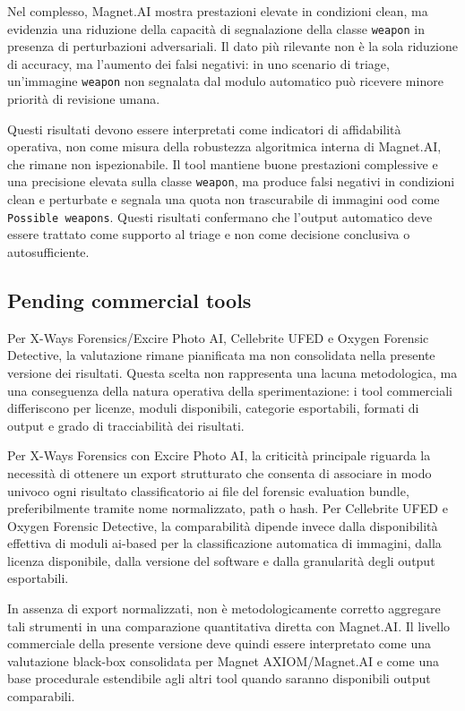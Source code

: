 Nel complesso, Magnet.AI mostra prestazioni elevate in condizioni clean, ma
evidenzia una riduzione della capacità di segnalazione della classe
\texttt{weapon} in presenza di perturbazioni adversariali. Il dato più rilevante
non è la sola riduzione di accuracy, ma l'aumento dei falsi negativi: in uno
scenario di triage, un'immagine \texttt{weapon} non segnalata dal modulo
automatico può ricevere minore priorità di revisione umana.

Questi risultati devono essere interpretati come indicatori di affidabilità
operativa, non come misura della robustezza algoritmica interna di Magnet.AI,
che rimane non ispezionabile. Il tool mantiene buone prestazioni complessive e
una precisione elevata sulla classe \texttt{weapon}, ma produce falsi negativi
in condizioni clean e perturbate e segnala una quota non trascurabile di immagini
\gls{ood} come \texttt{Possible weapons}. Questi risultati confermano che
l'output automatico deve essere trattato come supporto al triage e non come
decisione conclusiva o autosufficiente.


\subsection{Pending commercial tools}
\label{subsec:results-commercial-pending}

Per X-Ways Forensics/Excire Photo AI, Cellebrite UFED e Oxygen Forensic
Detective, la valutazione rimane pianificata ma non consolidata nella presente
versione dei risultati. Questa scelta non rappresenta una lacuna metodologica,
ma una conseguenza della natura operativa della sperimentazione: i tool
commerciali differiscono per licenze, moduli disponibili, categorie esportabili,
formati di output e grado di tracciabilità dei risultati.

Per X-Ways Forensics con Excire Photo AI, la criticità principale riguarda la
necessità di ottenere un export strutturato che consenta di associare in modo
univoco ogni risultato classificatorio ai file del forensic evaluation bundle,
preferibilmente tramite nome normalizzato, path o hash. Per Cellebrite UFED e
Oxygen Forensic Detective, la comparabilità dipende invece dalla disponibilità
effettiva di moduli \gls{ai}-based per la classificazione automatica di immagini,
dalla licenza disponibile, dalla versione del software e dalla granularità degli
output esportabili.

In assenza di export normalizzati, non è metodologicamente corretto aggregare
tali strumenti in una comparazione quantitativa diretta con Magnet.AI. Il
livello commerciale della presente versione deve quindi essere interpretato come
una valutazione black-box consolidata per Magnet AXIOM/Magnet.AI e come una base
procedurale estendibile agli altri tool quando saranno disponibili output
comparabili.


